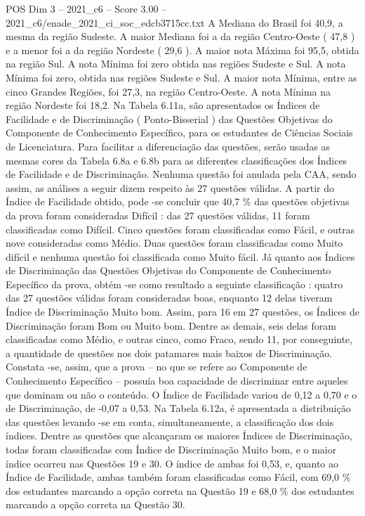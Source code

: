 \begin{textsample}{POS Dim 3 – 2021\_c6 – Score 3.00 – 2021\_c6/enade\_2021\_ci\_soc\_edcb3715cc.txt}
A Mediana do Brasil foi 40,9, a mesma da região Sudeste.
A maior Mediana foi a da região Centro-Oeste ( 47,8 ) e a menor foi a da região Nordeste ( 29,6 ).
A maior nota Máxima foi 95,5, obtida na região Sul.
A nota Mínima foi zero obtida nas regiões Sudeste e Sul.
A nota Mínima foi zero, obtida nas regiões Sudeste e Sul.
A maior nota Mínima, entre as cinco Grandes Regiões, foi 27,3, na região Centro-Oeste.
A nota Mínima na região Nordeste foi 18,2.
Na Tabela 6.11a, são apresentados os Índices de Facilidade e de Discriminação ( Ponto-Bisserial ) das Questões Objetivas do Componente de Conhecimento Específico, para os estudantes de Ciências Sociais de Licenciatura.
Para facilitar a diferenciação das questões, serão usadas as mesmas cores da Tabela 6.8a e 6.8b para as diferentes classificações dos Índices de Facilidade e de Discriminação.
Nenhuma questão foi anulada pela CAA, sendo assim, as análises a seguir dizem respeito às 27 questões válidas.
A partir do Índice de Facilidade obtido, pode -se concluir que 40,7 \% das questões objetivas da prova foram consideradas Difícil : das 27 questões válidas, 11 foram classificadas como Difícil.
Cinco questões foram classificadas como Fácil, e outras nove consideradas como Médio.
Duas questões foram classificadas como Muito difícil e nenhuma questão foi classificada como Muito fácil.
Já quanto aos Índices de Discriminação das Questões Objetivas do Componente de Conhecimento Específico da prova, obtém -se como resultado a seguinte classificação : quatro das 27 questões válidas foram consideradas boas, enquanto 12 delas tiveram Índice de Discriminação Muito bom.
Assim, para 16 em 27 questões, os Índices de Discriminação foram Bom ou Muito bom.
Dentre as demais, seis delas foram classificadas como Médio, e outras cinco, como Fraco, sendo 11, por conseguinte, a quantidade de questões nos dois patamares mais baixos de Discriminação.
Constata -se, assim, que a prova – no que se refere ao Componente de Conhecimento Específico – possuía boa capacidade de discriminar entre aqueles que dominam ou não o conteúdo.
O Índice de Facilidade variou de 0,12 a 0,70 e o de Discriminação, de -0,07 a 0,53.
Na Tabela 6.12a, é apresentada a distribuição das questões levando -se em conta, simultaneamente, a classificação dos dois índices.
Dentre as questões que alcançaram os maiores Índices de Discriminação, todas foram classificadas com Índice de Discriminação Muito bom, e o maior índice ocorreu nas Questões 19 e 30.
O índice de ambas foi 0,53, e, quanto ao Índice de Facilidade, ambas também foram classificadas como Fácil, com 69,0 \% dos estudantes marcando a opção correta na Questão 19 e 68,0 \% dos estudantes marcando a opção correta na Questão 30.

\end{textsample}
